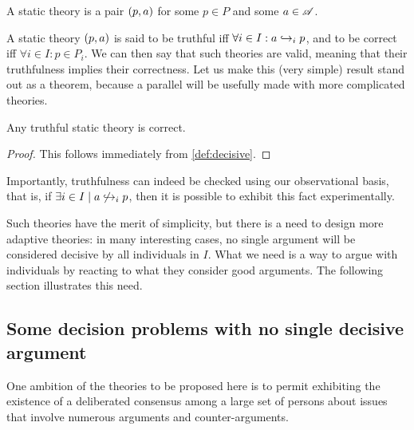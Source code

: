 \documentclass[version=last, pagesize, twoside=off, bibliography=totoc, DIV=calc, fontsize=12pt, a4paper, french, english]{scrartcl}
\begin{document}
\begin{definition}
	\label{def:static}
	A static theory is a pair $(p, \ar)$ for some $p \in P$ and some $\ar \in \allargs$.
\end{definition}
A static theory $(p, \ar)$ is said to be truthful iff $\forall i \in I: \ar \ileadstost p$, and to be correct iff $\forall i \in I: p \in P_i$.
We can then say that such theories are valid, meaning that their truthfulness implies their correctness. Let us make this (very simple) result stand out as a theorem, because a parallel will be usefully made with more complicated theories.
\begin{theorem}
	Any truthful static theory is correct.
\end{theorem}
\begin{proof}
	This follows immediately from \cref{def:decisive}.
\end{proof}
Importantly, truthfulness can indeed be checked using our observational basis, that is, if $\exists i \in I \suchthat \ar \nileadstost p$, then it is possible to exhibit this fact experimentally.

Such theories have the merit of simplicity, but there is a need to design more adaptive theories: in many interesting cases, no single argument will be considered decisive by all individuals in $I$. What we need is a way to argue with individuals by reacting to what they consider good arguments. The following section illustrates this need.

\subsection{Some decision problems with no single decisive argument}
\label{sec:lichtenstein}
One ambition of the theories to be proposed here is to permit exhibiting the existence of a deliberated consensus among a large set of persons about issues that involve numerous arguments and counter-arguments.
\end{document}
